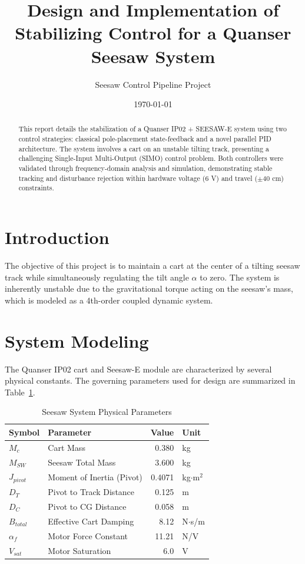 \documentclass[11pt,a4paper]{article}
\title{Design and Implementation of Stabilizing Control for a Quanser Seesaw System}
\author{Seesaw Control Pipeline Project}
\date{\today}
\begin{document}
\maketitle

\begin{abstract}
This report details the stabilization of a Quanser IP02 + SEESAW-E system using two control strategies: classical pole-placement state-feedback and a novel parallel PID architecture. The system involves a cart on an unstable tilting track, presenting a challenging Single-Input Multi-Output (SIMO) control problem. Both controllers were validated through frequency-domain analysis and simulation, demonstrating stable tracking and disturbance rejection within hardware voltage ($6$ V) and travel ($\pm 40$ cm) constraints.
\end{abstract}

\section{Introduction}
The objective of this project is to maintain a cart at the center of a tilting seesaw track while simultaneously regulating the tilt angle $\alpha$ to zero. The system is inherently unstable due to the gravitational torque acting on the seesaw's mass, which is modeled as a 4th-order coupled dynamic system.

\section{System Modeling}
The Quanser IP02 cart and Seesaw-E module are characterized by several physical constants. The governing parameters used for design are summarized in Table~\ref{tab:params}.

\begin{table}[H]
    \centering
    \caption{Seesaw System Physical Parameters}
    \label{tab:params}
    \begin{tabular}{l l r l}
        \toprule
        Symbol & Parameter & Value & Unit \\
        \midrule
        $M_c$ & Cart Mass & 0.380 & kg \\
        $M_{SW}$ & Seesaw Total Mass & 3.600 & kg \\
        $J_{pivot}$ & Moment of Inertia (Pivot) & 0.4071 & kg$\cdot$m$^2$ \\
        $D_T$ & Pivot to Track Distance & 0.125 & m \\
        $D_C$ & Pivot to CG Distance & 0.058 & m \\
        $B_{total}$ & Effective Cart Damping & 8.12 & N$\cdot$s/m \\
        $\alpha_f$ & Motor Force Constant & 11.21 & N/V \\
        $V_{sat}$ & Motor Saturation & 6.0 & V \\
        \bottomrule
    \end{tabular}
\end{table}
\end{document}

